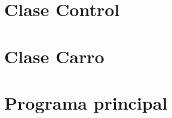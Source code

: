 \documentclass[12pt, letterpaper, oneside]{book}
\begin{document}
	\section{Clase Control}
	\label{sec:cont}
	
	
	\section{Clase Carro}
	\label{sec:car}
	
	
	\section{Programa principal}
	\label{sec:main}
	
\end{document}

